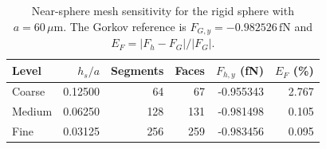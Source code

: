 \begin{table}[htbp]
    \centering
    \caption{Near-sphere mesh sensitivity for the rigid sphere with
    $a=60\,\mu\mathrm{m}$.  The Gorkov reference is
    $F_{G,y}=-0.982526\,\mathrm{fN}$ and
    $E_F=|F_h-F_G|/|F_G|$.}
    \label{tab:gorkovMeshConvergence}
    \small
    \begin{tabular}{lrrrrr}
        \toprule
        Level & $h_s/a$ & Segments & Faces & $F_{h,y}$ (fN) & $E_F$ (\%) \\
        \midrule
        Coarse & 0.12500 & 64  & 67  & -0.955343 & 2.767 \\
        Medium & 0.06250 & 128 & 131 & -0.981498 & 0.105 \\
        Fine   & 0.03125 & 256 & 259 & -0.983456 & 0.095 \\
        \bottomrule
    \end{tabular}
\end{table}
